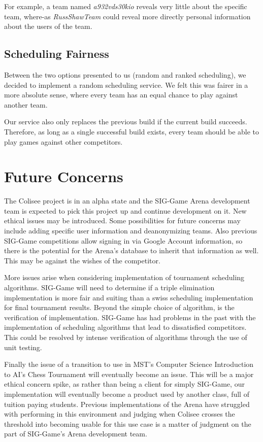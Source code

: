 \documentclass{article}
\begin{document}
For example, a team named \textit{a932vds30kio} reveals very little about the specific team, where-as \textit{RussShawTeam} could reveal more directly personal information about the users of the team.

\subsection{Scheduling Fairness}
Between the two options presented to us (random and ranked scheduling), we decided to implement a random scheduling service. We felt this was fairer in a more absolute sense, where every team has an equal chance to play against another team.

Our service also only replaces the previous build if the current build succeeds. Therefore, as long as a single successful build exists, every team should be able to play games against other competitors. 

\newpage
\section{Future Concerns}
The Colisee project is in an alpha state and the SIG-Game Arena development team is expected to pick this project up and continue development on it. New ethical issues may be introduced. Some possibilities for future concerns may include adding specific user information and deanonymizing teams. Also previous SIG-Game competitions allow signing in via Google Account information, so there is the potential for the Arena's database to inherit that information as well. This may be against the wishes of the competitor. 

More issues arise when considering implementation of tournament scheduling algorithms. SIG-Game will need to determine if a triple elimination implementation is more fair and suiting than a swiss scheduling implementation for final tournament results. Beyond the simple choice of algorithm, is the verification of implementation. SIG-Game has had problems in the past with the implementation of scheduling algorithms that lead to dissatisfied competitors. This could be resolved by intense verification of algorithms through the use of unit testing. 

Finally the issue of a transition to use in MST's Computer Science Introduction to AI's Chess Tournament will eventually become an issue. This will be a major ethical concern spike, as rather than being a client for simply SIG-Game, our implementation will eventually become a product used by another class, full of tuition paying students. Previous implementations of the Arena have struggled with performing in this environment  and judging when Colisee crosses the threshold into becoming usable for this use case is a matter of judgment on the part of SIG-Game's Arena development team.
\end{document}
